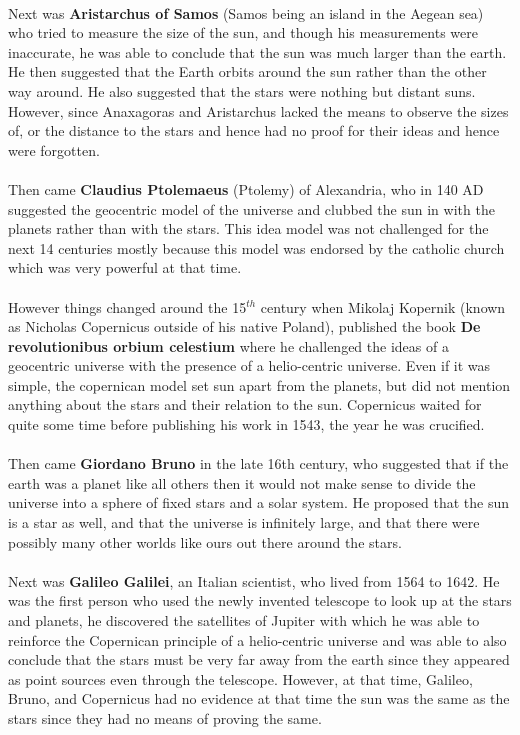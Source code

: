\documentclass[a4paper,twoside]{article}
\numberwithin{equation}{section}
\begin{document}
\paragraph{}
Next was \textbf{Aristarchus of Samos} (Samos being an island in the Aegean sea) who tried to measure the size of the sun, and though his measurements were inaccurate, he was able to conclude that the sun was much larger than the earth. He then suggested that the Earth orbits around the sun rather than the other way around. He also suggested that the stars were nothing but distant suns. However, since Anaxagoras and Aristarchus lacked the means to observe the sizes of, or the distance to the stars and hence had no proof for their ideas and hence were forgotten. 
\paragraph{}
Then came \textbf{Claudius Ptolemaeus} (Ptolemy) of Alexandria, who in 140 AD suggested the geocentric model of the universe and clubbed the sun in with the planets rather than with the stars. This idea model was not challenged for the next 14 centuries mostly because this model was endorsed by the catholic church which was very powerful at that time. 
\paragraph{}
However things changed around the 15$^{th}$ century when Mikolaj Kopernik (known as Nicholas Copernicus outside of his native Poland), published the book \textbf{De revolutionibus orbium celestium} where he challenged the ideas of a geocentric universe with the presence of a helio-centric universe. Even if it was simple, the copernican model set sun apart from the planets, but did not mention anything about the stars and their relation to the sun. Copernicus waited for quite some time before publishing his work in 1543, the year he was crucified. 
\paragraph{}
Then came \textbf{Giordano Bruno} in the late 16th century, who suggested that if the earth was a planet like all others then it would not make sense to divide the universe into a sphere of fixed stars and a solar system. He proposed that the sun is a star as well, and that the universe is infinitely large, and that there were possibly many other worlds like ours out there around the stars. 
\paragraph{}
Next was \textbf{Galileo Galilei}, an Italian scientist, who lived from 1564 to 1642. He was the first person who used the newly invented telescope to look up at the stars and planets, he discovered the satellites of Jupiter with which he was able to reinforce the Copernican principle of a helio-centric universe and was able to also conclude that the stars must be very far away from the earth since they appeared as point sources even through the telescope. However, at that time, Galileo, Bruno, and Copernicus had no evidence at that time the sun was the same as the stars since they had no means of proving the same. 
\end{document}
